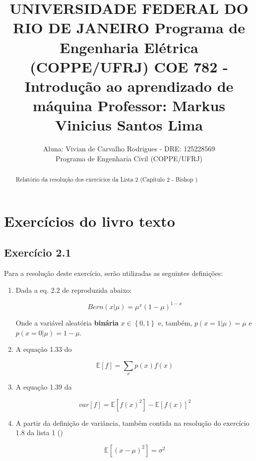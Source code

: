 \documentclass{article}
\title{UNIVERSIDADE FEDERAL DO RIO DE JANEIRO  \hspace{5cm}
	   Programa de Engenharia Elétrica (COPPE/UFRJ) \hspace{5cm}
	   COE 782 - Introdução ao aprendizado de máquina  \hspace{5cm} 
	  Professor: Markus Vinicius Santos Lima}
\author{Aluna: Vivian de Carvalho Rodrigues - DRE: 125228569  \\
	    Programa de Engenharia Civil (COPPE/UFRJ)}
\begin{document}
\maketitle

\begin{abstract}
Relatório da resolução dos exercícios da Lista 2 (Cap\'itulo 2 - Bishop \cite{Bishop2006})
\end{abstract}

\section{Exerc\'icios do livro texto}

\subsection{ Exerc\'icio 2.1}

 Para a resolução deste exercício, serão utilizadas as seguintes definições:
 
 \begin{enumerate}
 	\item  Dada  a eq. 2.2 de \cite{Bishop2006} reproduzida abaixo:
 	
 	\begin{equation}
 		Bern (x|\mu) = \mu^{x}(1-\mu)^{1-x}
 	\end{equation}
 	
 	Onde a variável aleatória \textbf{binária} $x \in \left\{ 0,1 \right\} $ e, também, $p(x=1|\mu)=\mu$ e $p(x=0|\mu)=1-\mu$. 
 	
 	\item A equação 1.33 do \cite{Bishop2006}
 	
 	  \begin{equation}
 	     \mathbb{E}[f] = \sum_{x} p(x) f(x) 
 	  \end{equation}
 	  
 	  
 	\item A equação 1.39 da \cite{Bishop2006}
 	
 	 \begin{equation}
 	 	var[f] = \mathbb{E}[f(x)^2]-\mathbb{E}[f(x)]^2
 	 \end{equation}
 	
 	 \item A partir da definição de variância, também contida na resolução do exercício 1.8 da lista 1 (\cite{lista1})
 	 
 	   \begin{equation}
 	   	\mathbb{E}[(x-\mu)^{2}] = \sigma^2
 	   \end{equation}
 	
  \end{enumerate}   
 	   
\end{document}
